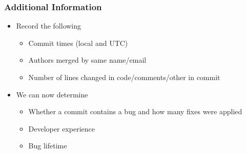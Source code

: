 \documentclass[aspectratio=43]{beamer}
\begin{document}
\begin{frame}
  \frametitle{Additional Information}

  \begin{itemize}

    \item Record the following

    \begin{itemize}
      \item Commit times (local and UTC)

      \item Authors merged by same name/email

      \item Number of lines changed in code/comments/other in commit
    \end{itemize}

    \item We can now determine    
  
      \begin{itemize}
        \item Whether a commit contains a bug and how many fixes were applied

        \item Developer experience

        \item Bug lifetime
      \end{itemize}
  \end{itemize}
\end{frame}
\end{document}
